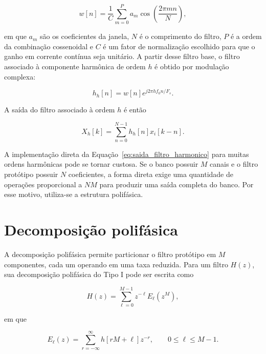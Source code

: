 \begin{equation}
w[n] = \frac{1}{C}\sum_{m=0}^{P} a_m \cos\left(\frac{2\pi mn}{N}\right),
\label{eq:janela_flattop}
\end{equation}

\noindent em que $a_m$ são os coeficientes da janela, $N$ é o comprimento do filtro, $P$ é a ordem da combinação cossenoidal e $C$ é um fator de normalização escolhido para que o ganho em corrente contínua seja unitário. A partir desse filtro base, o filtro associado à componente harmônica de ordem $h$ é obtido por modulação complexa:

\begin{equation}
h_h[n] = w[n]e^{j2\pi h f_0 n/F_s}.
\label{eq:filtro_harmonico}
\end{equation}

A saída do filtro associado à ordem $h$ é então

\begin{equation}
X_h[k] = \sum_{n=0}^{N-1} h_h[n]x_i[k-n].
\label{eq:saida_filtro_harmonico}
\end{equation}

A implementação direta da Equação~\eqref{eq:saida_filtro_harmonico} para muitas ordens harmônicas pode se tornar custosa. Se o banco possuir $M$ canais e o filtro protótipo possuir $N$ coeficientes, a forma direta exige uma quantidade de operações proporcional a $NM$ para produzir uma saída completa do banco. Por esse motivo, utiliza-se a estrutura polifásica.

\section{Decomposição polifásica}

A decomposição polifásica permite particionar o filtro protótipo em $M$ componentes, cada um operando em uma taxa reduzida. Para um filtro $H(z)$, sua decomposição polifásica do Tipo I pode ser escrita como \cite{mk06}

\begin{equation}
H(z) = \sum_{\ell=0}^{M-1} z^{-\ell}E_{\ell}(z^M),
\label{eq:decomposicao_polifasica}
\end{equation}

\noindent em que

\begin{equation}
E_{\ell}(z) = \sum_{r=-\infty}^{\infty} h[rM+\ell]z^{-r},
\qquad 0 \leq \ell \leq M-1.
\label{eq:componentes_polifasicos}
\end{equation}

